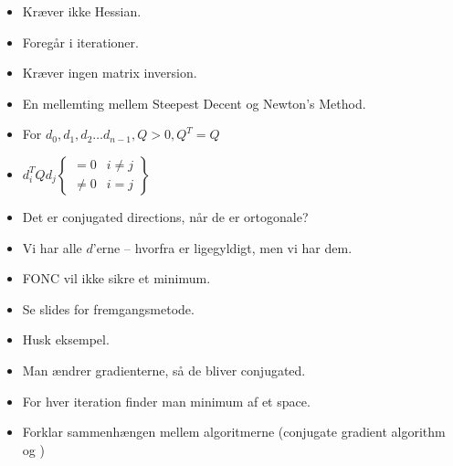 \documentclass[danish, 10pt]{Memoir}
\begin{document}
\begin{itemize}
	\item Kræver ikke Hessian.
	\item Foregår i iterationer.
	\item Kræver ingen matrix inversion.
	\item En mellemting mellem Steepest Decent og Newton's Method.
	
	\item For $d_0, d_1 , d_2 \dots d_{n-1}, Q > 0, Q^T = Q$
	\item $d_i^T Q d_j \begin{Bmatrix}
	= 0 & i \not= j \\
	\not= 0 & i = j
	\end{Bmatrix}$
	\item Det er conjugated directions, når de er ortogonale?
	\item Vi har alle $d$'erne -- hvorfra er ligegyldigt, men vi har dem.
	\item FONC vil ikke sikre et minimum.
	\item Se slides for fremgangsmetode.
	\item Husk eksempel.
	\item Man ændrer gradienterne, så de bliver conjugated.
	\item For hver iteration finder man minimum af et space.
	\item Forklar sammenhængen mellem algoritmerne (conjugate gradient algorithm og )
\end{itemize}
\end{document}
